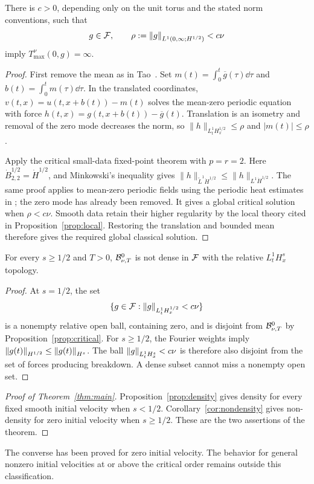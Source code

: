\begin{proposition}\label{prop:critical}
There is $c>0$, depending only on the unit torus and the stated norm conventions, such that
\begin{equation}\label{eq:smallcritical}
 g\in\mathcal F,\qquad
 \rho:=\left\lVert g\right\rVert_{L^1(0,\infty;H^{1/2})}<c\nu
\end{equation}
imply $T_{\max}^{\nu}(0,g)=\infty$.
\end{proposition}
\begin{proof}
First remove the mean as in Tao~\cite[Section~3, (36)--(38)]{tao2013}.
Set $m(t)=\int_0^t\overline g(\tau)\dd\tau$ and
$b(t)=\int_0^tm(\tau)\dd\tau$. In the translated coordinates,
$v(t,x)=u(t,x+b(t))-m(t)$ solves the mean-zero periodic equation with force
$h(t,x)=g(t,x+b(t))-\overline g(t)$. Translation is an isometry and removal
of the zero mode decreases the norm, so
$\|h\|_{L^1_tH^{1/2}_x}\le\rho$ and $|m(t)|\le\rho$.

Apply the critical small-data fixed-point theorem
\cite[Theorem~2.3.1 and its proof]{danchin} with $p=r=2$.
Here $\dot B^{1/2}_{2,2}=\dot H^{1/2}$, and Minkowski's inequality gives
$\|h\|_{\widetilde L^1\dot H^{1/2}}\le\|h\|_{L^1\dot H^{1/2}}$.
The same proof applies to mean-zero periodic fields using the periodic heat
estimates in \cite[Section~2.2.4, p.~44]{danchin}; the zero mode has already
been removed. It gives a global critical solution when $\rho<c\nu$.
Smooth data retain their higher regularity by the local theory cited in
Proposition~\ref{prop:local}. Restoring the translation and bounded mean
therefore gives the required global classical solution.
\end{proof}

\begin{corollary}\label{cor:nondensity}
For every $s\ge1/2$ and $T>0$, $\mathcal B^0_{\nu,T}$ is not dense in
$\mathcal F$ with the relative $L^1_tH^s_x$ topology.
\end{corollary}
\begin{proof}
At $s=1/2$, the set
\[
 \{g\in\mathcal F:\left\lVert g\right\rVert_{L^1_tH^{1/2}_x}<c\nu\}
\]
is a nonempty relative open ball, containing zero, and is disjoint from
$\mathcal B^0_{\nu,T}$ by Proposition~\ref{prop:critical}.
For $s\ge1/2$, the Fourier weights imply
$\left\lVert g(t)\right\rVert_{H^{1/2}}\le\left\lVert g(t)\right\rVert_{H^s}$.
The ball $\left\lVert g\right\rVert_{L^1_tH^s_x}<c\nu$ is therefore also disjoint from the set of forces producing breakdown. A dense subset cannot miss a nonempty open set.
\end{proof}

\begin{proof}[Proof of Theorem~\ref{thm:main}]
Proposition~\ref{prop:density} gives density for every fixed smooth initial velocity when $s<1/2$. Corollary~\ref{cor:nondensity} gives non-density for zero initial velocity when $s\ge1/2$. These are the two assertions of the theorem.
\end{proof}
The converse has been proved for zero initial velocity. The behavior for general nonzero initial velocities at or above the critical order remains outside this classification.

